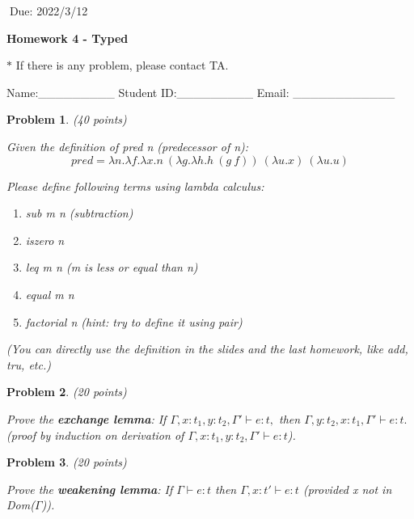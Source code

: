 \documentclass[12pt]{article}
\newtheorem{hw}{Problem}
\begin{document}
$\;$\hfill Due: 2022/3/12

\begin{center}
{\LARGE\bf Homework 4 - Typed}
\end{center}

\begin{center}
	\footnotesize{\color{red}$*$ If there is any problem, please contact TA.}
	
	\footnotesize{\color{blue} \quad Name:\_\_\_\_\_\_\_\_\_  \quad Student ID:\_\_\_\_\_\_\_\_\_ \quad Email: \_\_\_\_\_\_\_\_\_\_\_\_}
\end{center}

\begin{hw}\rm (40 points)
	
	Given the definition of \textit{pred n} (predecessor of n):
	\[pred = \lambda n.\lambda f.\lambda x.n\ (\lambda g.\lambda h.h\ (g\ f))\ (\lambda u.x)\ (\lambda u.u)\]    

	Please define following terms using lambda calculus:
	
	\begin{enumerate}
		\item sub m n (subtraction)
		\item iszero n
		\item leq m n (m is less or equal than n)
		\item equal m n
		\item factorial n (hint: try to define it using pair)
	\end{enumerate}
	(You can directly use the definition in the slides and the last homework, like add, tru, etc.)
\end{hw}

\begin{hw}\rm (20 points)
	
	Prove the \textbf{exchange lemma}: If $\Gamma, x:t_1,y:t_2, \Gamma'\vdash e:t, $ then $\Gamma, y:t_2, x:t_1, \Gamma' \vdash e:t.$ (proof by induction on derivation of $\Gamma, x:t_1, y:t_2, \Gamma' \vdash e:t$).
\end{hw}

\begin{hw}\rm (20 points)

	Prove the \textbf{weakening lemma}: If $\Gamma \vdash e:t$ then $\Gamma,x:t' \vdash e:t$ (provided x not in Dom($\Gamma$)).
\end{hw}

\end{document}
